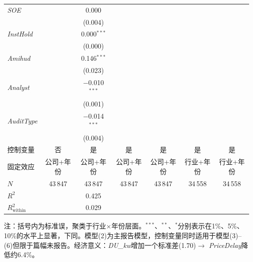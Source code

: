 \documentclass[11pt,a4paper]{article}
\begin{document}
\begin{table}[htbp]
\begin{tabular}{l*{6}{c}}
\textit{SOE}
 & & 0.000 & & & & \\
 & & (0.004) & & & & \\[2pt]
\textit{InstHold}
 & & 0.000$^{***}$ & & & & \\
 & & (0.000) & & & & \\[2pt]
\textit{Amihud}
 & & 0.146$^{***}$ & & & & \\
 & & (0.023) & & & & \\[2pt]
\textit{Analyst}
 & & $-$0.010$^{***}$ & & & & \\
 & & (0.001) & & & & \\[2pt]
\textit{AuditType}
 & & $-$0.014$^{***}$ & & & & \\
 & & (0.004) & & & & \\[4pt]
\midrule
控制变量 & 否 & 是 & 是 & 是 & 是 & 是 \\
固定效应 & 公司+年份 & 公司+年份 & 公司+年份 & 公司+年份 & 行业+年份 & 行业+年份 \\
$N$ & 43\,847 & 43\,847 & 43\,847 & 43\,847 & 34\,558 & 34\,558 \\
$R^2$ & & 0.425 & & & & \\
$R^2_{\text{within}}$ & & 0.029 & & & & \\
\bottomrule
\end{tabular}

\vspace{4pt}
{\footnotesize 注：括号内为标准误，聚类于行业$\times$年份层面。$^{***}$、$^{**}$、$^{*}$分别表示在1\%、5\%、10\%的水平上显著，下同。模型(2)为主报告模型，控制变量同时适用于模型(3)--(6)但限于篇幅未报告。经济意义：\textit{DU\_kw}增加一个标准差(1.70)$\to$ \textit{PriceDelay}降低约6.4\%。}
\end{table}


\FloatBarrier
\end{document}
